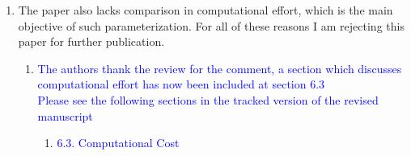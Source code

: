 \documentclass[11pt]{letter} %
\newcommand{\blue}{\textcolor{blue}}
\begin{document}
\begin{letter}
{\begin{enumerate}
\begin{enumerate}
\begin{enumerate}
\begin{enumerate}
\item \blue{5.1.4. 3-D PCA (i.e., using HOSVD) \& LinReg Case Pre-processing Algorithm}
   \end{enumerate}
        \end{enumerate}
    \item \label{R_R1_CompEffort} The paper also lacks comparison in computational effort, which is the main objective of such parameterization. For all of these reasons I am rejecting this paper for further publication.
      \begin{enumerate}
      \item \label{R_R1_CompEffort} \blue{The authors thank the review for the comment, a section which discusses computational effort has now been included at section 6.3}\\
        \blue{Please see the following sections in the tracked version of the revised manuscript}
   \begin{enumerate}
 \item \blue{6.3. Computational Cost}
   \end{enumerate}
        \end{enumerate}
    \end{enumerate}


\end{enumerate}}
\end{letter}
\end{document}
